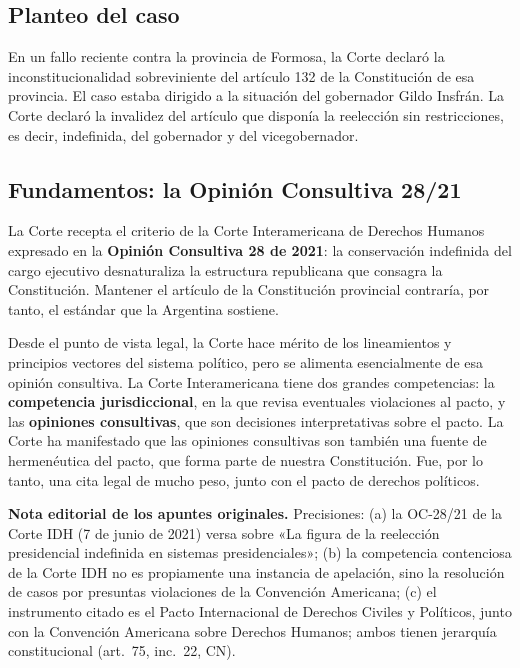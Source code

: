 \documentclass[12pt,oneside]{book}
\begin{document}
\subsection{Planteo del caso}

En un fallo reciente contra la provincia de Formosa, la Corte declaró la inconstitucionalidad sobreviniente del artículo 132 de la Constitución de esa provincia. El caso estaba dirigido a la situación del gobernador Gildo Insfrán. La Corte declaró la invalidez del artículo que disponía la reelección sin restricciones, es decir, indefinida, del gobernador y del vicegobernador.

\subsection{Fundamentos: la Opinión Consultiva 28/21}

La Corte recepta el criterio de la Corte Interamericana de Derechos Humanos expresado en la \textbf{Opinión Consultiva 28 de 2021}: la conservación indefinida del cargo ejecutivo desnaturaliza la estructura republicana que consagra la Constitución. Mantener el artículo de la Constitución provincial contraría, por tanto, el estándar que la Argentina sostiene.

Desde el punto de vista legal, la Corte hace mérito de los lineamientos y principios vectores del sistema político, pero se alimenta esencialmente de esa opinión consultiva. La Corte Interamericana tiene dos grandes competencias: la \textbf{competencia jurisdiccional}, en la que revisa eventuales violaciones al pacto, y las \textbf{opiniones consultivas}, que son decisiones interpretativas sobre el pacto. La Corte ha manifestado que las opiniones consultivas son también una fuente de hermenéutica del pacto, que forma parte de nuestra Constitución. Fue, por lo tanto, una cita legal de mucho peso, junto con el pacto de derechos políticos.

\begin{note}
\textbf{Nota editorial de los apuntes originales.} Precisiones: (a) la OC-28/21 de la Corte IDH (7 de junio de 2021) versa sobre «La figura de la reelección presidencial indefinida en sistemas presidenciales»; (b) la competencia contenciosa de la Corte IDH no es propiamente una instancia de apelación, sino la resolución de casos por presuntas violaciones de la Convención Americana; (c) el instrumento citado es el Pacto Internacional de Derechos Civiles y Políticos, junto con la Convención Americana sobre Derechos Humanos; ambos tienen jerarquía constitucional (art.~75, inc.~22, CN).
\end{note}
\end{document}
